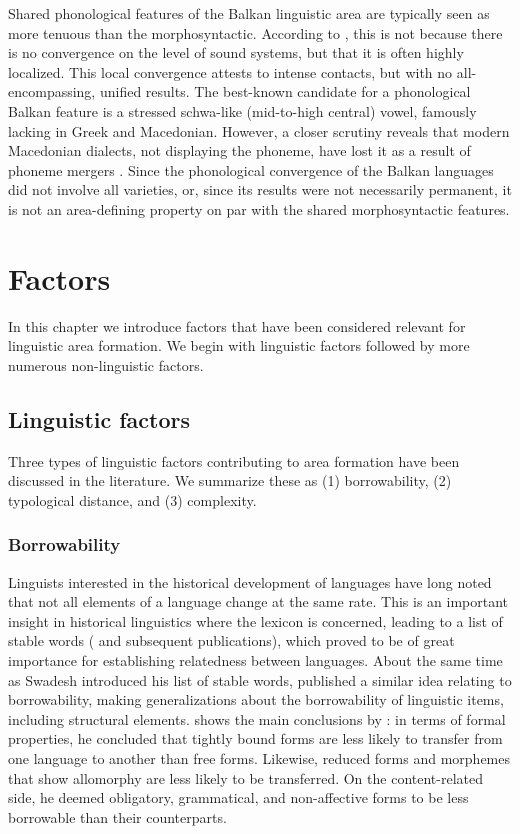 \documentclass[output=paper]{langscibook}
\begin{document}
\noindent Shared phonological features of the Balkan linguistic area are typically seen as more tenuous than the morphosyntactic. According to \textcite[278]{friedman11}, this is not because there is no convergence on the level of sound systems, but that it is often highly localized. This local convergence attests to intense contacts, but with no all-encompassing, unified results. The best-known candidate for a phonological Balkan feature is a stressed schwa-like (mid-to-high central) vowel, famously lacking in Greek and Macedonian. However, a closer scrutiny reveals that modern Macedonian dialects, not displaying the phoneme, have lost it as a result of phoneme mergers \parencite[46--48]{koneski65}. Since the phonological convergence of the Balkan languages did not involve all varieties, or, since its results were not necessarily permanent, it is not an area-defining property on par with the shared morphosyntactic features.

\section{Factors}

In this chapter we introduce factors that have been considered relevant for linguistic area formation. We begin with linguistic factors followed by more numerous non-linguistic factors. 

\subsection{Linguistic factors} \label{sec-lingfactors}

Three types of linguistic factors contributing to area formation have been discussed in the literature. We summarize these as (1) borrowability, (2) typological distance, and (3) complexity.

\subsubsection{Borrowability}

\noindent Linguists interested in the historical development of languages have long noted that not all elements of a language change at the same rate. This is an important insight in historical linguistics where the lexicon is concerned, leading to a list of stable words (\cite{swadesh1952lexicostatistic} and subsequent publications), which proved to be of great importance for establishing relatedness between languages. About the same time as Swadesh introduced his list of stable words, \textcite{Weinreich1953Languages} published a similar idea relating to borrowability, making generalizations about the borrowability of linguistic items, including structural elements.  shows the main conclusions by \textcite{Weinreich1953Languages}: in terms of formal properties, he concluded that tightly bound forms are less likely to transfer from one language to another than free forms. Likewise, reduced forms and morphemes that show allomorphy are less likely to be transferred. On the content-related side, he deemed obligatory, grammatical, and non-affective forms to be less borrowable than their counterparts.
\end{document}
